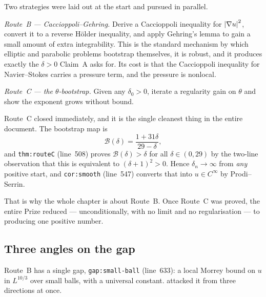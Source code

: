 Two strategies were laid out at the start and pursued in parallel.

\emph{Route~B --- Caccioppoli--Gehring.} Derive a Caccioppoli inequality for
\(\left|\nabla u\right|^2\), convert it to a reverse H\"older inequality, and apply
Gehring's lemma to gain a small amount of extra integrability. This is the
standard mechanism by which elliptic and parabolic problems bootstrap
themselves, it is robust, and it produces exactly the \(\delta>0\) Claim~A
asks for. Its cost is that the Caccioppoli inequality for Navier--Stokes
carries a pressure term, and the pressure is nonlocal.

\emph{Route~C --- the \(\theta\)-bootstrap.} Given any \(\delta_0>0\), iterate
a regularity gain on \(\theta\) and show the exponent grows without bound.

Route~C closed immediately, and it is the single cleanest thing in the entire
document. The bootstrap map is
\[
  \mathcal B(\delta) = \frac{1+31\delta}{29-\delta},
\]
and \texttt{thm:routeC} (line~508) proves \(\mathcal B(\delta)>\delta\) for
all \(\delta\in(0,29)\) by the two-line observation that this is equivalent to
\((\delta+1)^2>0\). Hence \(\delta_n\to\infty\) from \emph{any} positive
start, and \texttt{cor:smooth} (line~547) converts that into
\(u\in C^\infty\) by Prodi--Serrin.

That is why the whole chapter is about Route~B. Once Route~C was proved,
the entire Prize reduced --- unconditionally, with no limit and no
regularisation --- to producing one positive number.

\subsection{Three angles on the gap}

Route~B has a single gap, \texttt{gap:small-ball} (line~633): a local Morrey
bound on \(u\) in \(L^{10/3}\) over small balls, with a universal constant.
 attacked it from three directions at once.

